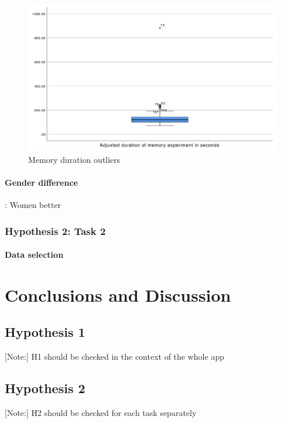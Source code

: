 		\begin{figure}
			\centering
			\includegraphics[width=0.7\linewidth]{graphics/memoryOutlier2}
			\caption{Memory duration outliers }
			\label{fig:memoryoutlier2}
		\end{figure}
	
		

		
		\paragraph{Gender difference}
		
		: Women better \cite{McBurney1997}
	
	\subsubsection{Hypothesis 2: Task 2}
	
	\paragraph{Data selection}
	
	
	
	
\section{Conclusions and Discussion}

	\subsection{Hypothesis 1}
	
	[Note:] H1 should be checked in the context of the whole app
	
	\subsection{Hypothesis 2}
	
	[Note:] H2 should be checked for each task separately
	
